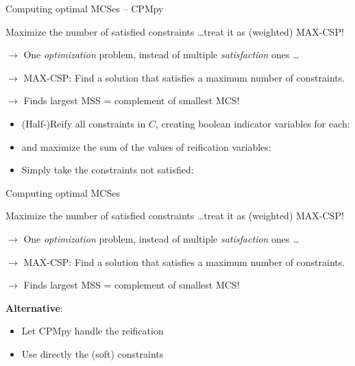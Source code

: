 \documentclass{cons-beamer}
\begin{document}
\begin{flashcardcpmpy}
\begin{frame}{Computing optimal MCSes -- CPMpy}
    
  Maximize the number of satisfied constraints \dots treat it as (weighted) MAX-CSP!

  $\xrightarrow{}$ One \textit{optimization} problem, instead of multiple \textit{satisfaction} ones \dots

  $\xrightarrow{}$ MAX-CSP: Find a solution that satisfies a maximum number of constraints.

  $\xrightarrow{}$ Finds largest MSS = complement of smallest MCS!
  \vspace{0.3cm}
  \vfill

  \begin{itemize}
    \item (Half-)Reify all constraints in $C$, creating boolean indicator variables for each: 
          

    \item and maximize the sum of the values of reification variables:
          

    \item Simply take the constraints not satisfied:
          
  \end{itemize}
\end{frame}
\end{flashcardcpmpy}

\begin{frame}{Computing optimal MCSes}
    
  Maximize the number of satisfied constraints \dots treat it as (weighted) MAX-CSP!

  $\xrightarrow{}$ One \textit{optimization} problem, instead of multiple \textit{satisfaction} ones \dots

  $\xrightarrow{}$ MAX-CSP: Find a solution that satisfies a maximum number of constraints.

  $\xrightarrow{}$ Finds largest MSS = complement of smallest MCS!
  \vfill

  \textbf{Alternative}: 
  \begin{itemize}
    \item Let CPMpy handle the reification
    \item Use directly the (soft) constraints
  \end{itemize}

  \footnotesize
\end{frame}
\end{document}
